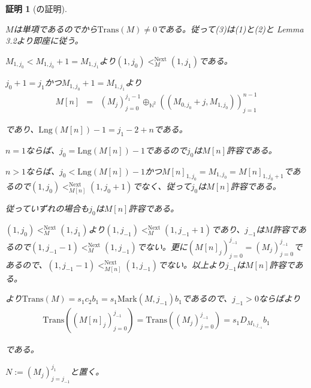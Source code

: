 \documentclass[dvipdfmx,uplatex]{jsarticle}
\newif\iffull
\theoremstyle{customnonumberbreakfortheorem}
\theoremstyle{customnonumberbreakforproof}
\newtheorem{hideableproof}{証明}
\begin{document}
\iffull{それでは本題に戻る。}\fi

\begin{hideableproof}[の証明]
	\begin{indented}
		\item \(M\)は単項であるのでから\(\textrm{Trans}(M) \neq 0\)である。従って(3)は(1)と(2)と\cite{buc1} Lemma 3.2より即座に従う。
		\item
		\item \(M_{1,j_0} < M_{1,j_0}+1 = M_{1,j_1}\)より\((1,j_0) <_M^{\textrm{Next}} (1,j_1)\)である。
		\item \(j_0+1 = j_1\)かつ\(M_{1,j_0}+1 = M_{1,j_1}\)より
		\begin{eqnarray*}
		M[n] & = & (M_j)_{j=0}^{j_1-1} \oplus_{\mathbb{N}^2} ((M_{0,j_0}+j,M_{1,j_0}))_{j=1}^{n-1}
		\end{eqnarray*}
		\item であり、\(\textrm{Lng}(M[n])-1 = j_1-2+n\)である。
		\item \(n = 1\)ならば、\(j_0 = \textrm{Lng}(M[n])-1\)であるので\(j_0\)は\(M[n]\)許容である。
		\item \(n > 1\)ならば、\(j_0 < \textrm{Lng}(M[n])-1\)かつ\(M[n]_{1,j_0} = M_{1,j_0} = M[n]_{1,j_0+1}\)であるので\((1,j_0) <_{M[n]}^{\textrm{Next}} (1,j_0+1)\)でなく、従って\(j_0\)は\(M[n]\)許容である。
		\item 従っていずれの場合も\(j_0\)は\(M[n]\)許容である。
		\item
		\item \((1,j_0) <_M^{\textrm{Next}} (1,j_1)\)より\((1,j_{-1}) <_M^{\textrm{Next}} (1,j_{-1}+1)\)であり、\(j_{-1}\)は\(M\)許容であるので\((1,j_{-1}-1) <_M^{\textrm{Next}} (1,j_{-1})\)でない。更に\((M[n]_j)_{j=0}^{j_{-1}} = (M_j)_{j=0}^{j_{-1}}\)であるので、\((1,j_{-1}-1) <_{M[n]}^{\textrm{Next}} (1,j_{-1})\)でない。以上より\(j_{-1}\)は\(M[n]\)許容である。
		\item {}より\(\textrm{Trans}(M) = s_1 c_2 b_1 = s_1 \textrm{Mark}(M,j_{-1}) b_1\)であるので、\(j_{-1} > 0\)ならばより
		\begin{eqnarray*}
		\textrm{Trans}((M[n]_j)_{j=0}^{j_{-1}}) = \textrm{Trans}((M_j)_{j=0}^{j_{-1}}) = s_1 D_{M_{1,j_{-1}}} b_1
		\end{eqnarray*}
		\item である。
		\item
		\item \(N := (M_j)_{j=j_{-1}}^{j_1}\)と置く。

\end{indented}
\end{hideableproof}
\end{document}

